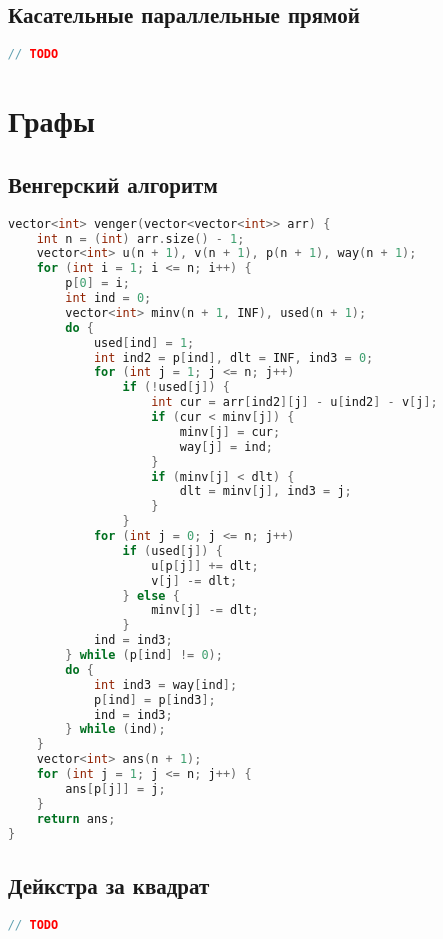 \documentclass[10pt,a4paper,landscape,twosided]{extarticle}
\begin{document}
\begin{multicols}{3}
\begin{lstlisting}[language=C++]
\end{lstlisting}

\subsection{Касательные параллельные прямой}
\begin{lstlisting}[language=C++]
// TODO

\end{lstlisting}

\section{Графы}

\subsection{Венгерский алгоритм}
\begin{lstlisting}[language=C++]
vector<int> venger(vector<vector<int>> arr) {
    int n = (int) arr.size() - 1;
    vector<int> u(n + 1), v(n + 1), p(n + 1), way(n + 1);
    for (int i = 1; i <= n; i++) {
        p[0] = i;
        int ind = 0;
        vector<int> minv(n + 1, INF), used(n + 1);
        do {
            used[ind] = 1;
            int ind2 = p[ind], dlt = INF, ind3 = 0;
            for (int j = 1; j <= n; j++)
                if (!used[j]) {
                    int cur = arr[ind2][j] - u[ind2] - v[j];
                    if (cur < minv[j]) {
                        minv[j] = cur;
                        way[j] = ind;
                    }
                    if (minv[j] < dlt) {
                        dlt = minv[j], ind3 = j;
                    }
                }
            for (int j = 0; j <= n; j++)
                if (used[j]) {
                    u[p[j]] += dlt;
                    v[j] -= dlt;
                } else {
                    minv[j] -= dlt;
                }
            ind = ind3;
        } while (p[ind] != 0);
        do {
            int ind3 = way[ind];
            p[ind] = p[ind3];
            ind = ind3;
        } while (ind);
    }
    vector<int> ans(n + 1);
    for (int j = 1; j <= n; j++) {
        ans[p[j]] = j;
    }
    return ans;
}

\end{lstlisting}

\subsection{Дейкстра за квадрат}
\begin{lstlisting}[language=C++]
// TODO


\end{lstlisting}
\end{multicols}
\end{document}
